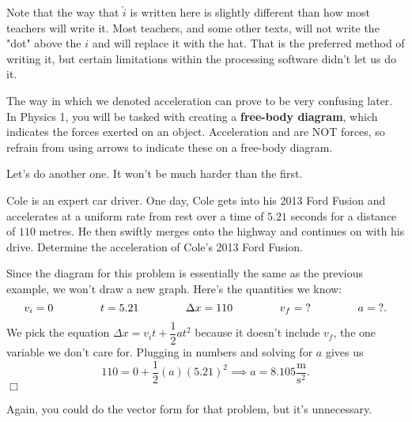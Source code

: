 \documentclass[../book.tex]{subfiles}
\begin{document}
\begin{remark}
Note that the way that $\hat{i}$ is written here is slightly different than how most teachers will write it.  Most teachers, and some other texts, will not write the "dot" above the $i$ and will replace it with the hat.  That is the preferred method of writing it, but certain limitations within the processing software didn't let us do it.
\end{remark}

\begin{note}
The way in which we denoted acceleration can prove to be very confusing later.  In Physics 1, you will be tasked with creating a \textbf{free-body diagram}, which indicates the forces exerted on an object.  Acceleration and are NOT forces, so refrain from using arrows to indicate these on a free-body diagram.   
\end{note}
Let's do another one.  It won't be much harder than the first.
\begin{example}
Cole is an expert car driver. One day, Cole gets into his 2013 Ford Fusion and accelerates at a uniform rate from rest over a time of $5.21$ seconds for a distance of $110$ metres.  He then swiftly merges onto the highway and continues on with his drive.  Determine the acceleration of Cole's 2013 Ford Fusion.
\end{example}
\begin{solution}
Since the diagram for this problem is essentially the same as the previous example, we won't draw a new graph.  Here's the quantities we know: $$v_i=0 \hspace{15mm} t=5.21 \hspace{15mm} \Delta x=110 \hspace{15mm} v_f=\text{?} \hspace{15mm} a=\text{?}.$$
We pick the equation $\Delta x=v_it+\dfrac{1}{2}at^2$ because it doesn't include $v_f$, the one variable we don't care for.  Plugging in numbers and solving for $a$ gives us $$110=0+\dfrac{1}{2}(a)(5.21)^2 \implies a=8.105\frac{\text{m}}{\text{s}^2}.$$ $\Box$
\end{solution}
Again, you could do the vector form for that problem, but it's unnecessary.
\end{document}
